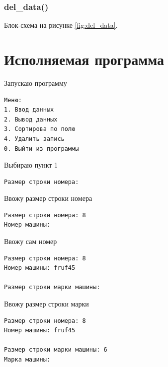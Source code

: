 \documentclass[12pt, a4paper]{article}
\begin{document}
\subsubsection{del\_data()}
Блок-схема на рисунке \ref{fig:del_data}.



\newpage

\section{Исполняемая программа}

Запускаю программу

\begin{tcolorbox}
\begin{verbatim}
Меню:
1. Ввод данных       
2. Вывод данных      
3. Сортирова по полю 
4. Удалить запись    
0. Выйти из программы
\end{verbatim}
\end{tcolorbox}

Выбираю пункт 1

\begin{tcolorbox}
\begin{verbatim}
Размер строки номера: 
\end{verbatim}
\end{tcolorbox}

Ввожу размер строки номера

\begin{tcolorbox}
\begin{verbatim}
Размер строки номера: 8  
Номер машины: 
\end{verbatim}
\end{tcolorbox}

Ввожу сам номер

\begin{tcolorbox}
\begin{verbatim}
Размер строки номера: 8  
Номер машины: fruf45

Размер строки марки машины: 
\end{verbatim}
\end{tcolorbox}

Ввожу размер строки марки 

\begin{tcolorbox}
\begin{verbatim}
Размер строки номера: 8
Номер машины: fruf45

Размер строки марки машины: 6
Марка машины: 
\end{verbatim}
\end{tcolorbox}
\end{document}
